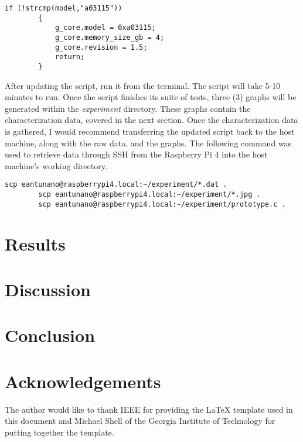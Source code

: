 \documentclass[journal]{IEEEtran}
\begin{document}
    \begin{lstlisting}[frame=single]
        if (!strcmp(model,"a03115"))
        {
            g_core.model = 0xa03115;
            g_core.memory_size_gb = 4;
            g_core.revision = 1.5;
            return;
        } 
    \end{lstlisting}

    After updating the script, run it from the terminal. 
    The script will take 5-10 minutes to run.
    Once the script finishes its suite of tests, three (3) graphs will be generated within the \emph{experiment} directory.
    These graphs contain the characterization data, covered in the next section.
    Once the characterization data is gathered, I would recommend transferring the updated script back to the host machine, along with the raw data, and the graphs.
    The following command was used to retrieve data through SSH from the Raspberry Pi 4 into the host machine's working directory.

    \begin{lstlisting}[frame=single]
        scp eantunano@raspberrypi4.local:~/experiment/*.dat .
        scp eantunano@raspberrypi4.local:~/experiment/*.jpg .
        scp eantunano@raspberrypi4.local:~/experiment/prototype.c .
    \end{lstlisting}

    \section{Results}

    \section{Discussion}

    \section{Conclusion}

    \nocite{*}
    \newpage

    
    

    \newpage
    \section{Acknowledgements}
    The author would like to thank IEEE for providing the LaTeX template used in this document and Michael Shell of the Georgia Institute of Technology for putting together the template.
\end{document}
